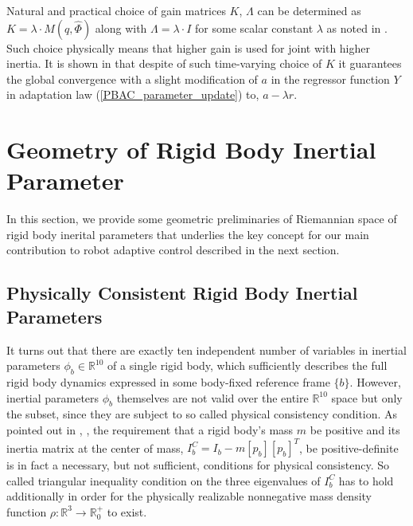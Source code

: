 \documentclass[letterpaper, 10 pt, conference]{ieeeconf}  %
\begin{document}
Natural and practical choice of gain matrices $K$, $\Lambda$ can be determined as $K = \lambda\cdot M(q,\hat{\Phi})$ along with $\Lambda = \lambda \cdot I$ for some scalar constant $\lambda$ as noted in \cite{Slotine_Composite}. Such choice physically means that higher gain is used for joint with higher inertia. It is shown in \cite{Slotine_Composite} that despite of such time-varying choice of $K$ it guarantees the global convergence with a slight modification of $a$ in the regressor function $Y$ in adaptation law (\ref{PBAC_parameter_update}) to, $a-\lambda r$.

\section{Geometry of Rigid Body Inertial Parameter}
In this section, we provide some geometric preliminaries of Riemannian space of rigid body inerital parameters that underlies the key concept for our main contribution to robot adaptive control described in the next section.
\subsection{Physically Consistent Rigid Body Inertial Parameters}
It turns out that there are exactly ten independent number of variables in inertial parameters $\phi_b\in\mathbb{R}^{10}$ of a single rigid body, which sufficiently describes the full rigid body dynamics expressed in some body-fixed reference frame $\{b\}$. However, inertial parameters $\phi_b$ themselves are not valid over the entire $\mathbb{R}^{10}$ space but only the subset, since they are subject to so called physical consistency condition. As pointed out in \cite{Wittenberg_Dynamics}, \cite{Traversaro_IROS}, the requirement that a rigid body's mass $m$ be positive
and its inertia matrix at the center of mass, $I_{b}^{C}=I_{b}-m[p_{b}][p_{b}]^{T}$, be positive-definite is in fact a necessary, but not sufficient, conditions for physical consistency. So called triangular inequality condition on the three eigenvalues of $I_{b}^{C}$ has to hold additionally in order for the physically realizable nonnegative mass density function $\rho : \mathbb{R}^{3} \rightarrow \mathbb{R}^{+}_{0}$ to exist. 
\end{document}
